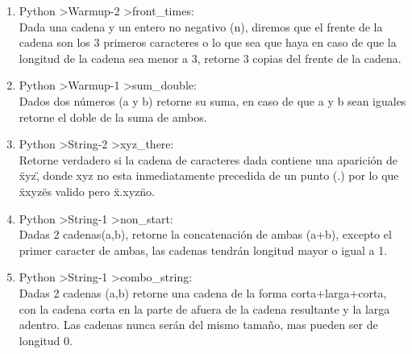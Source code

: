 \documentclass[11pt,letterpaper]{article}
\begin{document}
\begin{enumerate}
	\item Python \textgreater Warmup-2 \textgreater front\_times:\\
		Dada una cadena y un entero no negativo (n), diremos que el frente de la cadena son los 3 primeros caracteres o lo que sea que haya en caso de que la longitud de la cadena sea menor a 3, retorne 3 copias del frente de la cadena. 

	\item Python \textgreater Warmup-1 \textgreater sum\_double:\\
		Dados dos números (a y b) retorne su suma, en caso de que a y b sean iguales retorne el doble de la suma de ambos.

	\item Python \textgreater String-2 \textgreater xyz\_there:\\
		Retorne verdadero si la cadena de caracteres dada contiene una aparición de \"xyz\", donde xyz no esta inmediatamente precedida de un punto (.) por lo que \"xxyz\" es valido pero \"x.xyz\" no.
	
	\item Python \textgreater String-1 \textgreater non\_start:\\
		Dadas 2 cadenas(a,b), retorne la concatenación de ambas (a+b), excepto el primer caracter de ambas, las cadenas tendrán longitud mayor o igual a 1.

	\item Python \textgreater String-1 \textgreater combo\_string:\\
		Dadas 2 cadenas (a,b) retorne una cadena de la forma corta+larga+corta, con la cadena corta en la parte de afuera de la cadena resultante y la larga adentro. Las cadenas nunca serán del mismo tamaño, mas pueden ser de longitud 0. 
\end{enumerate}




\end{document}
